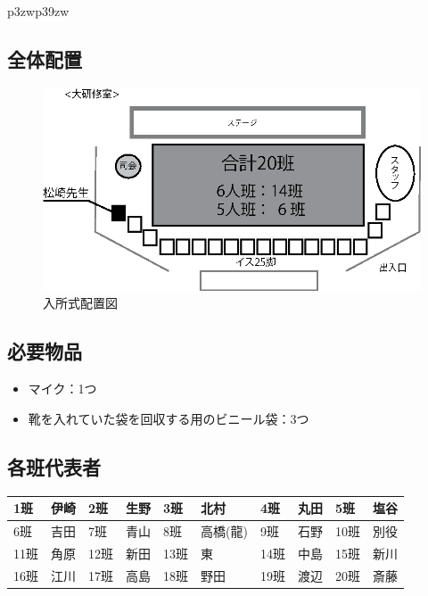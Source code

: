 \begin{longtable}{p{}p{}}
\subsection{全体配置}
\begin{figure}[H]
  \begin{center}
  \includegraphics[scale=1.5]{./08/nyushoshiki.eps}
  \caption{入所式配置図}
  \label{nyusyosiki}
  \end{center}
\end{figure}


\subsection{必要物品}
\begin{itemize}
\item マイク：1つ
\item 靴を入れていた袋を回収する用のビニール袋：3つ
\end{itemize}

\clearpage

\subsection{各班代表者}
\begin{table}[htb]
  \begin{center}
  \begin{tabular}{|l|l||l|l||l|l||l|l||l|l|} \hline
  1班 & 伊崎 & 2班 & 生野 & 3班 & 北村 & 4班 & 丸田 & 5班 & 塩谷 \\ \hline
  6班 & 吉田 & 7班 & 青山 & 8班 & 高橋(龍) & 9班 & 石野 & 10班 & 別役  \\  \hline
  11班 & 角原 & 12班 & 新田 & 13班 & 東 & 14班 & 中島 & 15班 & 新川 \\ \hline
  16班 & 江川 & 17班 & 高島 & 18班 & 野田 & 19班 & 渡辺 & 20班 & 斎藤 \\ \hline
    \end{tabular}
  \end{center}
\end{table}



\end{longtable}
